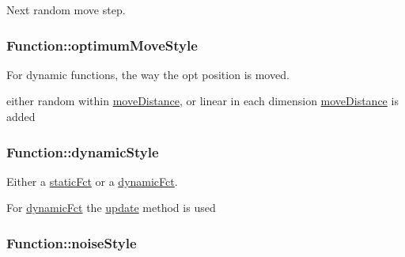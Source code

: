 Next random move step. 

\hypertarget{classFunction_d3e8dc5ddc0a0c1227ed3e4bd75c3ab2}{
\subsubsection{ {\bf Function::optimumMoveStyle}}}
\label{classFunction_d3e8dc5ddc0a0c1227ed3e4bd75c3ab2}


For dynamic functions, the way the opt position is moved. 

either random within \hyperlink{classFunction_79f1670ff72b16c5b4af46d700dbc66c}{moveDistance}, or linear in each dimension \hyperlink{classFunction_79f1670ff72b16c5b4af46d700dbc66c}{moveDistance} is added \hypertarget{classFunction_74e755186ee4ac7685a38f7bfd6c9618}{
\subsubsection{ {\bf Function::dynamicStyle}}}
\label{classFunction_74e755186ee4ac7685a38f7bfd6c9618}


Either a \hyperlink{optfunctions_8h_ae9aa3a5dd199a43e77abc2cccf4477e0b2fe9dd5d310c8ff1b24a9d223d1b78}{staticFct} or a \hyperlink{optfunctions_8h_ae9aa3a5dd199a43e77abc2cccf4477ea12bc396312caea8de48af78a769175a}{dynamicFct}. 

For \hyperlink{optfunctions_8h_ae9aa3a5dd199a43e77abc2cccf4477ea12bc396312caea8de48af78a769175a}{dynamicFct} the \hyperlink{classFunction_31bae656cf84683529a1a8c19c9f0a67}{update} method is used \hypertarget{classFunction_aa5472c04034818ced6ad381760451c3}{
\subsubsection{ {\bf Function::noiseStyle}}}
\label{classFunction_aa5472c04034818ced6ad381760451c3}


